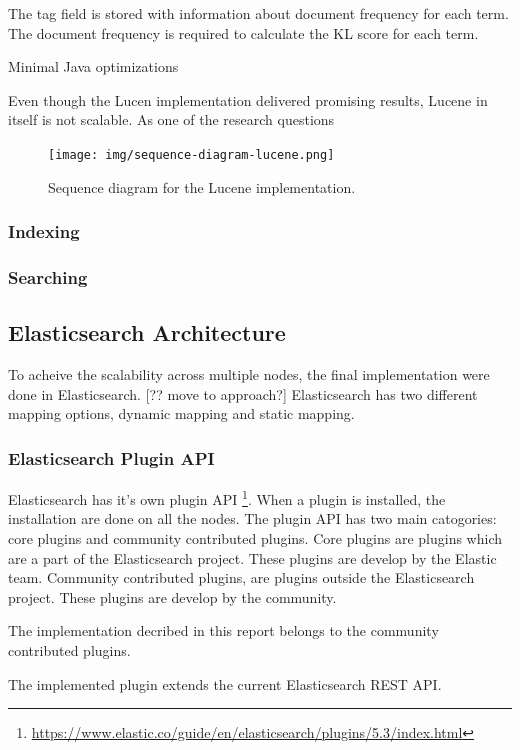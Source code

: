 The tag field is stored with information about document frequency for each term.
The document frequency is required to calculate the KL score for each term.

Minimal Java optimizations

Even though the Lucen implementation delivered promising results, Lucene in itself is not scalable.
As one of the research questions

\begin{figure}[h!]
  \centering \texttt{[image: img/sequence-diagram-lucene.png]}
  \caption{Sequence diagram for the Lucene implementation.}
  \label{fig:sequence-diagram-lucene}
\end{figure}

\subsubsection{Indexing}
\subsubsection{Searching}



\subsection{Elasticsearch Architecture}
To acheive the scalability across multiple nodes, the final implementation were done in Elasticsearch.
[?? move to approach?]
Elasticsearch has two different mapping options, dynamic mapping and static mapping.

\subsubsection{Elasticsearch Plugin API}
Elasticsearch has it's own plugin API \footnote{\url{https://www.elastic.co/guide/en/elasticsearch/plugins/5.3/index.html}}.
When a plugin is installed, the installation are done on all the nodes.
The plugin API has two main catogories: core plugins and community contributed plugins.
Core plugins are plugins which are a part of the Elasticsearch project.
These plugins are develop by the Elastic team.
Community contributed plugins, are plugins outside the Elasticsearch project.
These plugins are develop by the community.

The implementation decribed in this report belongs to the community contributed plugins.

The implemented plugin extends the current Elasticsearch REST API.

